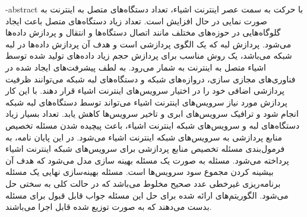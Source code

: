 \blankpage
\fa-abstract{
  با حرکت به سمت عصر اینترنت اشیاء، تعداد دستگاه‌های متصل به اینترنت به صورت نمایی در حال افزایش است.
  تعداد زیاد دستگاه‌های متصل باعث ایجاد گلوگاه‌هایی در حوزه‌های مختلف مانند اتصال دستگاه‌ها و انتقال و پردازش داده‌ها می‌شود.
  پردازش لبه که یک الگوی پردازشی است و هدف آن پردازش داده‌ها در لبه شبکه می‌باشد، یک روش مناسب برای پردازش حجم زیاد داده‌های تولید شده توسط اشیاء متصل به اینترنت به شمار می‌رود.
  به لطف پیشرفت‌های ایجاد شده در فناوری‌های مجازی سازی، دروازه‌های شبکه و دستگاه‌های لبه شبکه می‌توانند ظرفیت پردازشی اضافی خود را در اختیار سرویس‌های اینترنت اشیاء قرار دهند.
  با این کار پردازش‌ مورد نیاز سرویس‌های اینترنت اشیاء می‌تواند توسط دستگاه‌های لبه شبکه انجام شود و ترافیک سرویس‌های ابری و تاخیر سرویس‌ها کاهش یابد.
  تعداد بسیار زیاد دستگاه‌های لبه و سرویس‌های شبکه اینترنت اشیاء، باعث پیچیده شدن مسئله تخصیص منابع پردازشی به سرویس‌های شبکه اینترنت اشیاء می‌شود.
  در این پایان نامه، به فرمول‌بندی مسئله تخصیص منابع پردازشی برای سرویس‌های شبکه اینترنت اشیاء پرداخته می‌شود.
  مسئله به صورت یک مسئله بهینه سازی مدل می‌شود که هدف آن بیشینه کردن مجموع سود سرویس‌ها است.
  مسئله بهینه‌سازی نهایی یک مسئله برنامه‌ریزی غیرخطی عدد صحیح مخلوط می‌باشد که در حالت کلی به سختی حل می‌شود.
  الگوریتم‌های ارائه شده برای حل این مسئله جواب قابل قبول برای مسئله بدست می‌دهند که به صورت توزیع شده قابل اجرا می‌باشند.
}

\blankpage
\abstractPage

\newpage\clearpage
